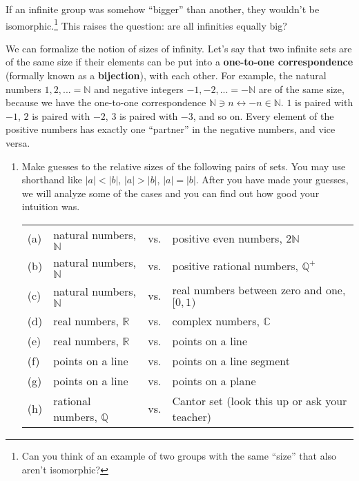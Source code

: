 \documentclass[../gatm.tex]{subfiles}
\begin{document}
If an infinite group was somehow ``bigger'' than another, they wouldn't be isomorphic.\footnote{Can you think of an example of two groups with the same ``size'' that also aren't isomorphic?} This raises the question: are all infinities equally big?

We can formalize the notion of sizes of infinity. Let's say that two infinite sets are of the same size if their elements can be put into a \textbf{one-to-one correspondence} (formally known as a \textbf{bijection}), with each other. For example, the natural numbers ${1,2,...}=\mathbb{N}$ and negative integers ${-1,-2,...}=-\mathbb{N}$ are of the same size, because we have the one-to-one correspondence $\mathbb{N} \ni n\leftrightarrow -n \in \mathbb{N}$. $1$ is paired with $-1$, $2$ is paired with $-2$, $3$ is paired with $-3$, and so on. Every element of the positive numbers has exactly one ``partner'' in the negative numbers, and vice versa.

\begin{enumerate}
\setcounter{enumi}{\value{inf_problem_i}}
\item Make guesses to the relative sizes of the following pairs of sets. You may use shorthand like $|a| < |b|$, $|a| > |b|$, $|a| = |b|$. After you have made your guesses, we will analyze some of the cases and you can find out how good your intuition was.

\begin{tabular}{llll} %
(a) & natural numbers, $\mathbb{N}$ & vs. & positive even numbers, $2\mathbb{N}$ \\
(b) & natural numbers, $\mathbb{N}$ & vs. & positive rational numbers, $\mathbb{Q}^+$ \\
(c) & natural numbers, $\mathbb{N}$ & vs. & real numbers between zero and one, $[0,1)$ \\
(d) & real numbers, $\mathbb{R}$ & vs. & complex numbers, $\mathbb{C}$ \\
(e) & real numbers, $\mathbb{R}$ & vs. & points on a line \\
(f) & points on a line & vs. & points on a line segment \\
(g) & points on a line & vs. & points on a plane \\
(h) & rational numbers, $\mathbb{Q}$ & vs. & Cantor set (look this up or ask your teacher) \\ %
\end{tabular}

\setcounter{inf_problem_i}{\value{enumi}}
\end{enumerate}
\end{document}
